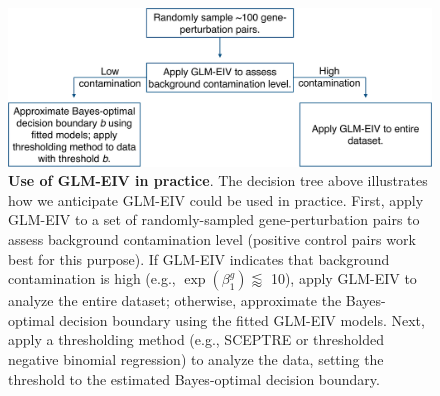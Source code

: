 \documentclass[12pt]{article}
\begin{document}
\clearpage
\begin{figure}[h!]
	\centering
	\includegraphics[width=0.9\linewidth]{../../figures/dec_tree/dec_tree_crop}
	\caption{\textbf{Use of GLM-EIV in practice}. The decision tree above illustrates how we anticipate GLM-EIV could be used in practice. First, apply GLM-EIV to a set of randomly-sampled gene-perturbation pairs to assess background contamination level (positive control pairs work best for this purpose). If GLM-EIV indicates that background contamination is high (e.g., $\exp(\beta^g_1) \lessapprox $ 10), apply GLM-EIV to analyze the entire dataset; otherwise, approximate the Bayes-optimal decision boundary using the fitted GLM-EIV models. Next, apply a thresholding method (e.g., SCEPTRE or thresholded negative binomial regression) to analyze the data, setting the threshold to the estimated Bayes-optimal decision boundary.}\label{fig:dec_tree}
\end{figure}
\clearpage
\end{document}
